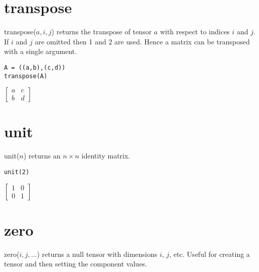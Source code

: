 \section*{transpose}
transpose($a,i,j$) returns the transpose of tensor $a$ with respect to indices $i$ and $j$.
If $i$ and $j$ are omitted then 1 and 2 are used.
Hence a matrix can be transposed with a single argument.

\begin{Verbatim}[formatcom=\color{blue},samepage=true]
A = ((a,b),(c,d))
transpose(A)
\end{Verbatim}

$\displaystyle \begin{bmatrix}a & c\\ b & d\end{bmatrix}$

\section*{unit}
unit($n$) returns an $n\times n$ identity matrix.

\begin{Verbatim}[formatcom=\color{blue},samepage=true]
unit(2)
\end{Verbatim}

$\displaystyle \begin{bmatrix}1&0\\0&1\end{bmatrix}$

\section*{zero}
zero($i,j,\ldots$) returns a null tensor with dimensions $i$, $j$, etc.
Useful for creating a tensor and then setting the component values.
